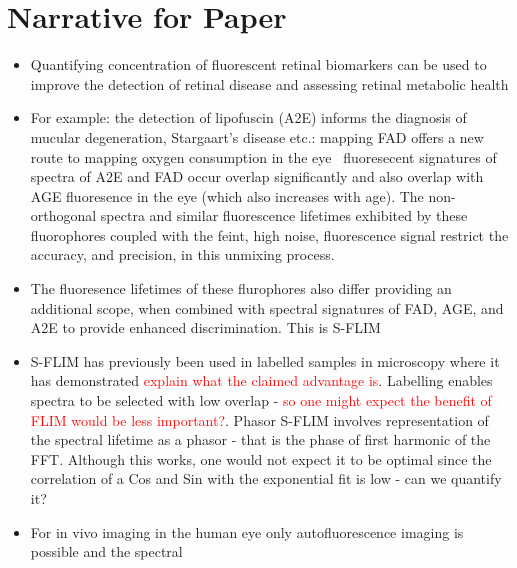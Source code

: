 \documentclass{optica-article}
\begin{document}
\section{Narrative for Paper}
\begin{itemize}
    \item Quantifying concentration of fluorescent retinal biomarkers can be used to improve the detection of retinal disease and assessing retinal metabolic health
    \item For example: the detection of lipofuscin (A2E) informs the diagnosis of mucular degeneration, Stargaart's disease etc.: mapping FAD offers a new route to mapping oxygen consumption in the eye
    \ fluoresecent signatures of spectra of A2E and FAD occur overlap significantly and also overlap with AGE fluoresence in the eye (which also increases with age). The non-orthogonal spectra and similar fluorescence lifetimes exhibited by these fluorophores coupled with the feint, high noise, fluorescence signal restrict the accuracy, and precision, in this unmixing process.
    \item The fluoresence lifetimes of these flurophores also differ providing an additional scope, when combined with spectral signatures  of FAD, AGE, and A2E to provide enhanced discrimination. This is S-FLIM
    \item S-FLIM has previously been used in labelled samples in microscopy where it has demonstrated \textcolor{red}{explain what the claimed advantage is}. Labelling enables spectra to be selected with low overlap - \textcolor{red}{so one might expect the benefit of FLIM would be less important?}. Phasor S-FLIM involves representation of the spectral lifetime as a phasor - that is the phase of first harmonic of the FFT. Although this works, one would not expect it to be optimal since the correlation of a Cos and Sin with the exponential fit is low - can we quantify it?
    \item For in vivo imaging in the human eye only autofluorescence imaging is possible and the spectral 
   

\end{itemize}
\end{document}

